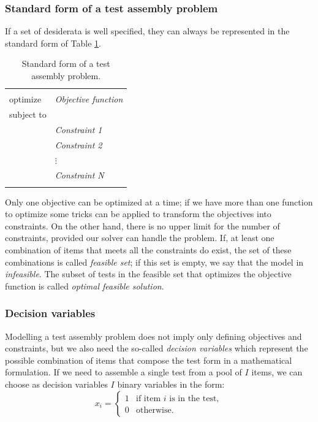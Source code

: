 \subsubsection{Standard form of a test assembly problem}

If a set of desiderata is well specified, they can always be represented in the standard form of Table \ref{tab:stform}.

\begin{table}
	\centering
	\begin{tabular}{|ll|}
		\hline    & \\
		optimize & \textit{Objective function} \\
		subject to & \\
		& \textit{Constraint 1} \\
		& \textit{Constraint 2} \\
		& $\vdots$ \\
		& \textit{Constraint N} \\
		& \\
		\hline
	\end{tabular}
	\caption{Standard form of a test assembly problem.}\label{tab:stform}
\end{table}

Only one objective can be optimized at a time; if we have more than one function to optimize some tricks can be applied to transform the objectives into constraints. On the other hand, there is no upper limit for the number of constraints, provided our solver can handle the problem.
If, at least one combination of items that meets all the constraints do exist, the set of these combinations is called \emph{feasible set}; if this set is empty, we say that the model in \emph{infeasible}.
The subset of tests in the feasible set that optimizes the objective function is called \emph{optimal feasible solution}.

\subsubsection{Decision variables}

Modelling a test assembly problem does not imply only defining objectives and constraints, but we also need the so-called \emph{decision variables} which represent the possible combination of items that compose the test form in a mathematical formulation.
If we need to assemble a single test from a pool of $I$ items, we can choose as decision variables $I$ binary variables in the form:
\begin{equation*}
x_{i}=
\begin{cases}
1 & \mbox{if item }i \mbox{ is in the test},\\
0 & \mbox{otherwise}.
\end{cases}
\end{equation*}

